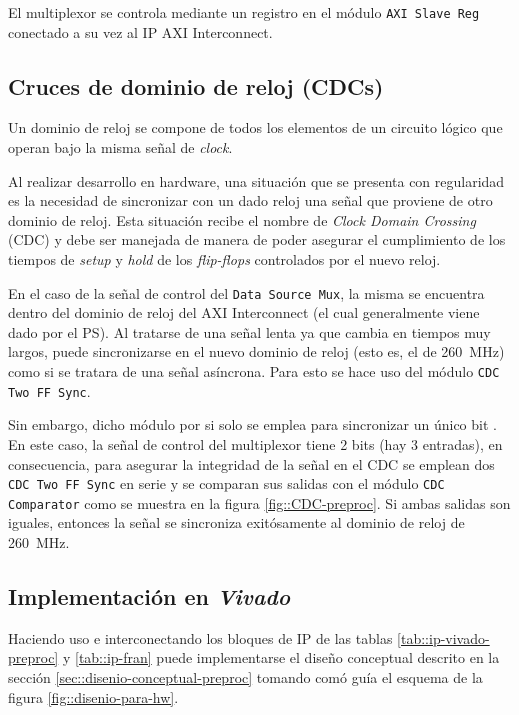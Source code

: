 \documentclass[../../main.tex]{subfiles}
\begin{document}
El multiplexor se controla mediante un registro en el módulo \texttt{AXI Slave Reg} conectado a su vez al IP AXI Interconnect.

\subsection{Cruces de dominio de reloj (CDCs)}
Un dominio de reloj se compone de todos los elementos de un circuito lógico que operan bajo la misma señal de \textit{clock}.

Al realizar desarrollo en hardware, una situación que se presenta con regularidad es la necesidad de sincronizar con un dado reloj una señal que proviene de otro dominio de reloj. Esta situación recibe el nombre de \textit{Clock Domain Crossing} (CDC) y debe ser manejada de manera de poder asegurar el cumplimiento de los tiempos de \textit{setup} y \textit{hold} de los \textit{flip-flops} controlados por el nuevo reloj.

En el caso de la señal de control del \texttt{Data Source Mux}, la misma se encuentra dentro del dominio de reloj del AXI Interconnect (el cual generalmente viene dado por el PS). Al tratarse de una señal lenta ya que cambia en tiempos muy largos, puede sincronizarse en el nuevo dominio de reloj (esto es, el de 260~MHz) como si se tratara de una señal asíncrona. Para esto se hace uso del módulo \texttt{CDC Two FF Sync}.

Sin embargo, dicho módulo por si solo se emplea para sincronizar un único bit . En este caso, la señal de control del multiplexor tiene 2 bits (hay 3 entradas), en consecuencia, para asegurar la integridad de la señal en el CDC se emplean dos \texttt{CDC Two FF Sync} en serie y se comparan sus salidas con el módulo \texttt{CDC Comparator} como se muestra en la figura \ref{fig::CDC-preproc}. Si ambas salidas son iguales, entonces la señal se sincroniza exitósamente al dominio de reloj de 260~MHz.


\subsection{Implementación en \textit{Vivado}}
Haciendo uso e interconectando los bloques de IP de las tablas \ref{tab::ip-vivado-preproc} y \ref{tab::ip-fran} puede implementarse el diseño conceptual descrito en la sección \ref{sec::disenio-conceptual-preproc} tomando comó guía el esquema de la figura \ref{fig::disenio-para-hw}. 
\end{document}

